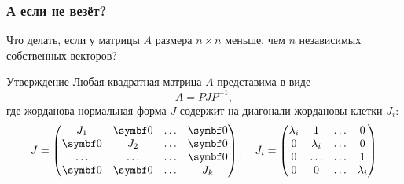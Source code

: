 \begin{frame}
  \frametitle{А если не везёт?}

  Что делать, если у матрицы $A$ размера $n\times n$ меньше, чем $n$ независимых
  собственных векторов? \pause
  
  
  \begin{block}{Утверждение}
  Любая квадратная матрица $A$ представима в виде
  \[
  A = P J P^{-1},  
  \]
  где \alert{жорданова нормальная форма} $J$ содержит на диагонали \alert{жордановы клетки} $J_i$:
  \[
  J = \begin{pmatrix}
    J_1 & \bzero & \ldots & \bzero \\
    \bzero & J_2 & \ldots & \bzero \\
    \ldots & \ldots & \ldots & \bzero \\
    \bzero & \bzero & \ldots & J_k \\
  \end{pmatrix}, \quad
  J_i = \begin{pmatrix}
\lambda_i & 1 & \ldots & 0 \\
0 & \lambda_i & \ldots & 0 \\
0 & \ldots & \ldots & 1 \\
0 & 0 & \ldots & \lambda_i \\    
  \end{pmatrix}
  \]
  \end{block}

\end{frame}










      
